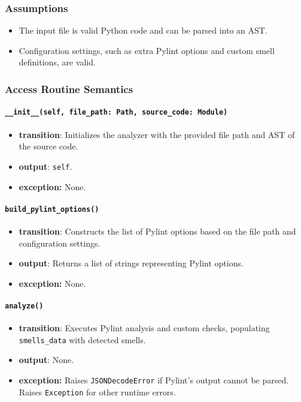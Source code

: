 \documentclass[12pt, titlepage]{article}
\begin{document}
\subsubsection{Assumptions}
\begin{itemize}
  \item The input file is valid Python code and can be parsed into an AST.
  \item Configuration settings, such as extra Pylint options and custom smell definitions, are valid.
\end{itemize}

\subsubsection{Access Routine Semantics}

\paragraph{\texttt{\_\_init\_\_(self, file\_path: Path, source\_code: Module)}}
\begin{itemize}
  \item \textbf{transition}: Initializes the analyzer with the provided file path and AST of the source code.
  \item \textbf{output}: \texttt{self}.
  \item \textbf{exception:} None.
\end{itemize}

\paragraph{\texttt{build\_pylint\_options()}}
\begin{itemize}
  \item \textbf{transition}: Constructs the list of Pylint options based on the file path and configuration settings.
  \item \textbf{output}: Returns a list of strings representing Pylint options.
  \item \textbf{exception:} None.
\end{itemize}

\paragraph{\texttt{analyze()}}
\begin{itemize}
  \item \textbf{transition}: Executes Pylint analysis and custom checks, populating \texttt{smells\_data} with detected smells.
  \item \textbf{output}: None.
  \item \textbf{exception:} Raises \texttt{JSONDecodeError} if Pylint's output cannot be parsed. Raises \texttt{Exception} for other runtime errors.
\end{itemize}
\end{document}

